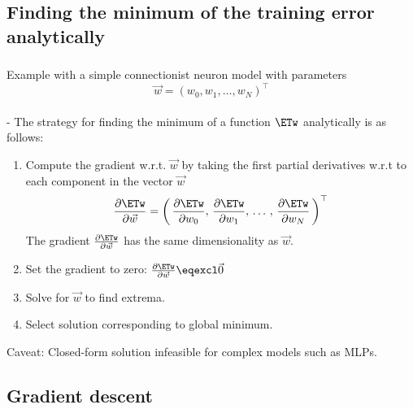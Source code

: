 \subsection{Finding the minimum of the training error analytically}

\begin{frame}\frametitle{\subsecname}

    Example with a simple connectionist neuron model
    with parameters
    $$\vec w = (w_{0}, w_{1}, \ldots, w_{N})^{\top}$$\\


    - The strategy for finding the minimum of a function $\ETw$ analytically is as follows:
    \pause
    \begin{enumerate}
    \item Compute the gradient w.r.t. $\vec w$ by taking the first partial derivatives w.r.t to each component in the vector $\vec w$
    \begin{equation}
        \frac{\partial \ETw}{\partial \vec w} = \left(\,
        \frac{\partial \ETw}{\partial w_{0}}, \,
        \frac{\partial \ETw}{\partial w_{1}}, \,\ldots\,,\, 
        \frac{\partial \ETw}{\partial w_{N}}\,
        \right)^{\top}
        \label{eq:gradient_partial}
    \end{equation}
    The gradient $\frac{\partial \ETw}{\partial \vec w}$ has the same dimensionality as $\vec w$.
    \pause
    
    \item Set the gradient to zero: $\frac{\partial \ETw}{\partial \vec w} \eqexcl \vec 0$
    \item Solve for $\vec w$ to find extrema.
    \item Select solution corresponding to global minimum.
    
    \end{enumerate}
    
    Caveat: Closed-form solution infeasible for complex models such as MLPs.
    
\end{frame}

\subsection{Gradient descent}

